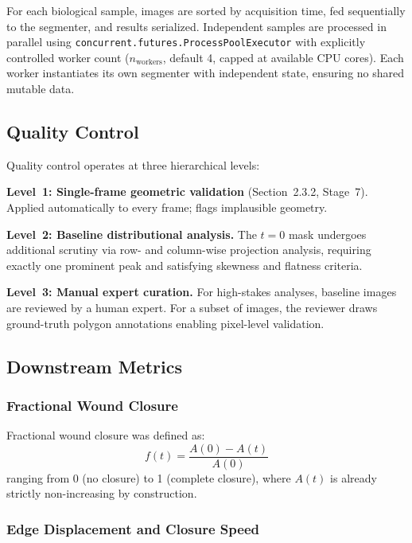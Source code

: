For each biological sample, images are sorted by acquisition time, fed sequentially to the
segmenter, and results serialized.
Independent samples are processed in parallel using
\texttt{concurrent.futures.ProcessPoolExecutor} with explicitly controlled worker count
($n_\text{workers}$, default 4, capped at available CPU cores).
Each worker instantiates its own segmenter with independent state, ensuring no shared mutable
data.

\subsection{Quality Control}

Quality control operates at three hierarchical levels:

\textbf{Level~1: Single-frame geometric validation} (Section~2.3.2, Stage~7).
Applied automatically to every frame; flags implausible geometry.

\textbf{Level~2: Baseline distributional analysis.}
The $t = 0$ mask undergoes additional scrutiny via row- and column-wise projection analysis,
requiring exactly one prominent peak and satisfying skewness and flatness criteria.

\textbf{Level~3: Manual expert curation.}
For high-stakes analyses, baseline images are reviewed by a human expert.
For a subset of images, the reviewer draws ground-truth polygon annotations enabling
pixel-level validation.

\subsection{Downstream Metrics}

\subsubsection{Fractional Wound Closure}

Fractional wound closure was defined as:
\begin{equation}
  f(t) = \frac{A(0) - A(t)}{A(0)}
  \label{eq:fractional-closure}
\end{equation}
ranging from 0 (no closure) to 1 (complete closure), where $A(t)$ is already strictly
non-increasing by construction.

\subsubsection{Edge Displacement and Closure Speed}

